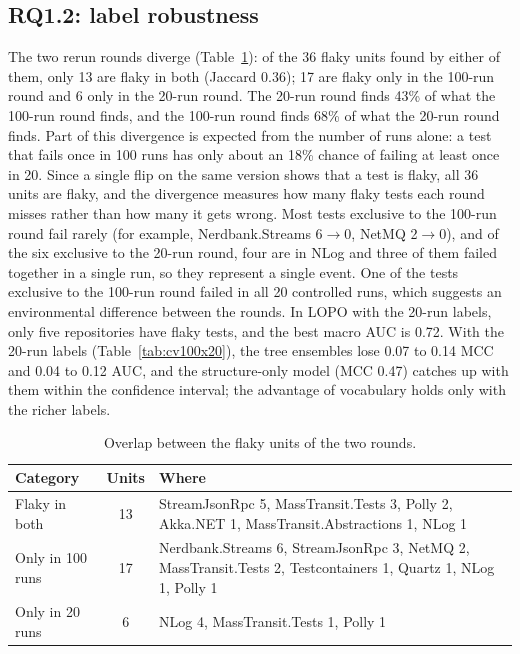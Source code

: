 \subsection{RQ1.2: label robustness}
\label{sec:rq12}
The two rerun rounds diverge (Table~\ref{tab:sobreposicao}): of the 36 flaky units found by either of them, only 13 are flaky in both (Jaccard 0.36); 17 are flaky only in the 100-run round and 6 only in the 20-run round. The 20-run round finds 43\% of what the 100-run round finds, and the 100-run round finds 68\% of what the 20-run round finds. Part of this divergence is expected from the number of runs alone: a test that fails once in 100 runs has only about an 18\% chance of failing at least once in 20. Since a single flip on the same version shows that a test is flaky, all 36 units are flaky, and the divergence measures how many flaky tests each round misses rather than how many it gets wrong.  Most tests exclusive to the 100-run round fail rarely (for example, Nerdbank.Streams 6$\to$0, NetMQ 2$\to$0), and of the six exclusive to the 20-run round, four are in NLog and three of them failed together in a single run, so they represent a single event. One of the tests exclusive to the 100-run round failed in all 20 controlled runs, which suggests an environmental difference between the rounds.  In LOPO with the 20-run labels, only five repositories have flaky tests, and the best macro AUC is 0.72.  With the 20-run labels (Table~\ref{tab:cv100x20}), the tree ensembles lose 0.07 to 0.14 MCC and 0.04 to 0.12 AUC, and the structure-only model (MCC 0.47) catches up with them within the confidence interval; the advantage of vocabulary holds only with the richer labels. 

\begin{table}[!h]
\caption{Overlap between the flaky units of the two rounds.}
\label{tab:sobreposicao}
\centering
\footnotesize
\begin{tabular}{@{}lcp{}@{}}
\toprule
\textbf{Category} & \textbf{Units} & \textbf{Where} \tabularnewline
\midrule
Flaky in both & 13 & \raggedright StreamJsonRpc 5, MassTransit.Tests 3, Polly 2, Akka.NET 1, MassTransit.Abstractions 1, NLog 1 \tabularnewline[2pt]
Only in 100 runs & 17 & \raggedright Nerdbank.Streams 6, StreamJsonRpc 3, NetMQ 2, MassTransit.Tests 2, Testcontainers 1, Quartz 1, NLog 1, Polly 1 \tabularnewline[2pt]
Only in 20 runs & 6 & \raggedright NLog 4, MassTransit.Tests 1, Polly 1 \tabularnewline
\bottomrule
\end{tabular}
\end{table}

